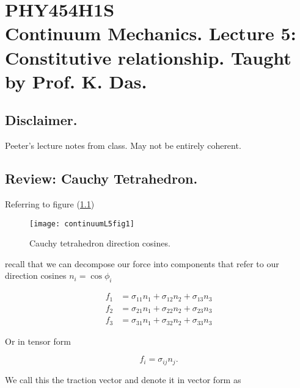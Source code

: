 
%

\chapter{PHY454H1S\\Continuum Mechanics.  Lecture 5: Constitutive relationship.  Taught by Prof. K. Das.}
\label{chap:continuumL5}
{}
\date{Jan 25, 2012}

\beginArtWithToc

\section{Disclaimer.}

Peeter's lecture notes from class.  May not be entirely coherent.

\section{Review: Cauchy Tetrahedron.}

Referring to figure (\ref{fig:continuumL5:continuumL5fig1})
\begin{figure}[htp]
   \centering
   \texttt{[image: continuumL5fig1]}
   \caption{Cauchy tetrahedron direction cosines.}\label{fig:continuumL5:continuumL5fig1}
\end{figure}

recall that we can decompose our force into components that refer to our direction cosines $n_i = \cos\phi_i$

\begin{align}\label{eqn:continuumL5:10}
f_1 &= \sigma_{11} n_1 + \sigma_{12} n_2 + \sigma_{13} n_3 \\
f_2 &= \sigma_{21} n_1 + \sigma_{22} n_2 + \sigma_{23} n_3 \\
f_3 &= \sigma_{31} n_1 + \sigma_{32} n_2 + \sigma_{33} n_3
\end{align}

Or in tensor form

\begin{equation}\label{eqn:continuumL5:30}
f_i = \sigma_{ij} n_j.
\end{equation}

We call this the traction vector and denote it in vector form as

